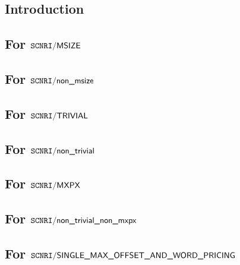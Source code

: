\subsection{Introduction}                                          \label{mxp: computation: intro}                               
\subsection{For $\texttt{SCNRI}\textsf{/}{\textsf{MSIZE}}$}                               \label{mxp: computation: msize}                               
\subsection{For $\texttt{SCNRI}\textsf{/}{\textsf{non\_msize}}$}                         \label{mxp: computation: non msize}                           
\subsection{For $\texttt{SCNRI}\textsf{/}{\textsf{TRIVIAL}}$}                    \label{mxp: computation: trivial}                                                               
\subsection{For $\texttt{SCNRI}\textsf{/}{\textsf{non\_trivial}}$}              \label{mxp: computation: nontrivial}                          
\subsection{For $\texttt{SCNRI}\textsf{/}{\textsf{MXPX}}$}                                \label{mxp: computation: mxpx}                                
\subsection{For $\texttt{SCNRI}\textsf{/}{\textsf{non\_trivial\_non\_mxpx}}$}                \label{mxp: computation: nontrivial_unexceptional}                                                                        
\subsection{For $\texttt{SCNRI}\textsf{/}{\textsf{SINGLE\_MAX\_OFFSET\_AND\_WORD\_PRICING}}$}       \label{mxp: computation: single_max_offset_word}              
